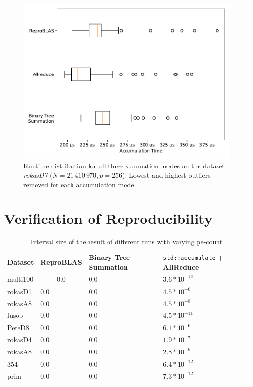 \begin{figure}
\centering
\includegraphics[scale=0.75]{figures/boxplotRokasD7.pdf}
\caption{Runtime distribution for all three summation modes on the dataset \textit{rokasD7} ($N = 21\,410\,970, p = 256$). Lowest and highest outliers removed for each accumulation mode.}
\label{fig:boxplotRokasD7}
\end{figure}


\section{Verification of Reproducibility}
\label{sec:VerificationOfReproducibility}

\begin{table}
\centering
\begin{tabular}{llll}
\textbf{Dataset} & \textbf{ReproBLAS }& \textbf{Binary Tree Summation} & \texttt{std::accumulate}\textbf{ + AllReduce} \\
multi100 & $$0.0$$ & $0.0$ & $3.6 * 10^{-12}$ \\
rokasD1 & $0.0$ & $0.0$ & $4.5 * 10^{-6}$ \\
rokasA8 & $0.0$ & $0.0$ & $4.5 * 10^{-8}$ \\
fusob & $0.0$ & $0.0$ & $4.5 * 10^{-11}$ \\
PeteD8 & $0.0$ & $0.0$ & $6.1 * 10^{-6}$ \\
rokasD4 & $0.0$ & $0.0$ & $1.9 * 10^{-7}$ \\
rokasA8 & $0.0$ & $0.0$ & $2.8 * 10^{-6}$ \\
354 & $0.0$ & $0.0$ & $6.4 * 10^{-12}$ \\
prim & $0.0$ & $0.0$ & $7.3 * 10^{-12}$
\end{tabular}
\caption{Interval size of the result of different runs with varying \gls{pe}-count}
\label{table:runDeviation}
\end{table}

